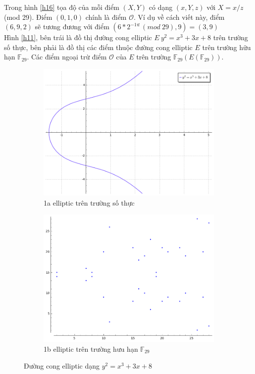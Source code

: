 \documentclass[a4paper,12pt]{report}
\begin{document}
Trong hình \ref{h16} tọa độ của mỗi điểm $(X, Y)$ có dạng $(x, Y, z)$ với $X = x/z$ (mod 29). Điểm $(0, 1, 0)$ chính là điểm $\mathcal{O}$. Ví dụ về cách viết này, điểm $(6, 9, 2)$ sẽ tương đương với điểm $(6 * 2^{-1ư} \ ( mod \ 29 ), 9) = (3, 9)$ \\

Hình \ref{h11}, bên trái là đồ thị đường cong elliptic $E \ y^2 = x^3 + 3x + 8$ trên trường số thực, bên phải là đồ thị các điểm thuộc đường cong elliptic $E$ trên trường hữu hạn $\mathbb{F}_{29}$. Các điểm ngoại trừ điểm $\mathcal{O}$ của $E$ trên trường $\mathbb{F}_{29}(E(\mathbb{F}_{29}))$.

\begin{figure}[h]
\begin{subfigure}{.5\textwidth}
  \centering
  \includegraphics[width=1\linewidth]{../im11.png}
  \caption{1a elliptic trên trường số thực}
  \label{fig:sfig1}
\end{subfigure}%
\begin{subfigure}{.5\textwidth}
  \centering
  \includegraphics[width=1\linewidth]{../im12.png}
  \caption{1b elliptic trên trường hưu hạn $\mathbb{F}_{29}$}
  \label{fig:sfig2}
\end{subfigure}
\caption{Đường cong elliptic dạng $y^2 = x^3 + 3x + 8$} \label{h11}
\label{fig:fig}
\end{figure}
\end{document}
